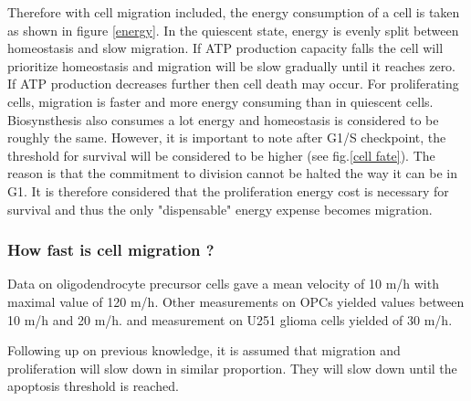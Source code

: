 \documentclass[11pt,a4paper]{article}
\begin{document}
Therefore with cell migration included, the energy consumption of a cell is taken as shown in figure \ref{energy}. In the quiescent state, energy is evenly split between homeostasis and slow migration. If ATP production capacity falls the cell will prioritize homeostasis and migration will be slow gradually until it reaches zero. If ATP production decreases further then cell death may occur. For proliferating cells, migration is faster and more energy consuming than in quiescent cells. Biosynsthesis also consumes a lot energy and homeostasis is considered to be roughly the same. However, it is important to note after G1/S checkpoint, the threshold for survival will be considered to be higher (see fig.\ref{cell fate}). The reason is that the commitment to division cannot be halted the way it can be in G1. It is therefore considered that the proliferation energy cost is necessary for survival and thus the only "dispensable" energy expense becomes migration.  
 

\subsubsection{How fast is cell migration ?}
Data on oligodendrocyte precursor cells  gave a mean velocity of 10 \textmu m/h with maximal value of 120 \textmu m/h.\cite{Happel2013} Other measurements on OPCs yielded values between 10 \textmu m/h and 20 \textmu m/h. and measurement on U251 glioma cells yielded of 30 \textmu m/h.\cite{Piltti2017}   

Following up on previous knowledge, it is assumed that migration and proliferation will slow down in similar proportion. They will slow down until the apoptosis threshold is reached.
\end{document}
